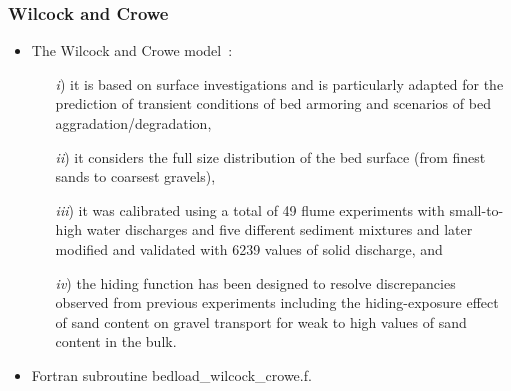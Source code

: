 \subsubsection{Wilcock and Crowe}
\begin{itemize}
\item {}

The Wilcock and Crowe model~\cite{Wilcock2003}:
\begin{itemize}
     \item[{\it i})] it is based on surface investigations and is particularly adapted for the prediction of transient conditions of bed armoring and scenarios of bed aggradation/degradation,
     \item[{\it ii})] it considers the full size distribution of the bed surface (from finest sands to coarsest gravels),
     \item[{\it iii})] it was calibrated using a total of 49 flume experiments with small-to-high water discharges and five different sediment mixtures and later modified and validated with 6239 values of solid discharge, and
     \item[{\it iv})] the hiding function has been designed to resolve discrepancies observed from previous experiments \cite{Proffitt1983,Parker1990} including the hiding-exposure effect of sand content on gravel transport for weak to high values of sand content in the bulk.
\end{itemize}

\item Fortran subroutine {\ttfamily bedload\_wilcock\_crowe.f}.
\end{itemize}

